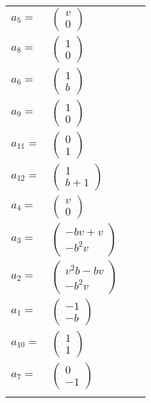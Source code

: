 \documentclass[1p]{elsarticle_modified}
\theoremstyle{definition}
\begin{document}
\begin{tabular}{m{7pt} m{180pt} m{7pt} m{180pt} }
\flushright $a_{5}=$&$\begin{pmatrix}v\\0\end{pmatrix}$ \\
\flushright $a_{8}=$&$\begin{pmatrix}1\\0\end{pmatrix}$ \\
\flushright $a_{6}=$&$\begin{pmatrix}1\\b\end{pmatrix}$ \\
\flushright $a_{9}=$&$\begin{pmatrix}1\\0\end{pmatrix}$ \\
\flushright $a_{11}=$&$\begin{pmatrix}0\\1\end{pmatrix}$ \\
\flushright $a_{12}=$&$\begin{pmatrix}1\\b+1\end{pmatrix}$ \\
\flushright $a_{4}=$&$\begin{pmatrix}v\\0\end{pmatrix}$ \\
\flushright $a_{3}=$&$\begin{pmatrix}- b v+v\\- b^2 v\end{pmatrix}$ \\
\flushright $a_{2}=$&$\begin{pmatrix}v^2 b- b v\\- b^2 v\end{pmatrix}$ \\
\flushright $a_{1}=$&$\begin{pmatrix}-1\\- b\end{pmatrix}$ \\
\flushright $a_{10}=$&$\begin{pmatrix}1\\1\end{pmatrix}$ \\
\flushright $a_{7}=$&$\begin{pmatrix}0\\-1\end{pmatrix}$\\&\end{tabular}
\end{document}
